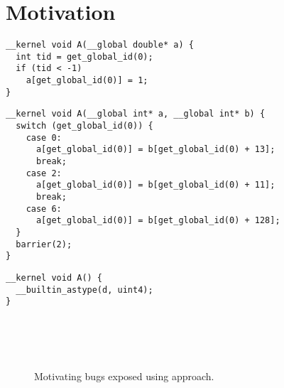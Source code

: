 \section{Motivation}

\newsavebox{\IntelSizetIntReduced}
\begin{lrbox}{\IntelSizetIntReduced}
\begin{lstlisting}
__kernel void A(__global double* a) {
  int tid = get_global_id(0);
  if (tid < -1)
    a[get_global_id(0)] = 1;
}
\end{lstlisting}
\end{lrbox}

\newsavebox{\OclgrindRaceSwitch}
\begin{lrbox}{\OclgrindRaceSwitch}
\begin{lstlisting}
__kernel void A(__global int* a, __global int* b) {
  switch (get_global_id(0)) {
    case 0:
      a[get_global_id(0)] = b[get_global_id(0) + 13];
      break;
    case 2:
      a[get_global_id(0)] = b[get_global_id(0) + 11];
      break;
    case 6:
      a[get_global_id(0)] = b[get_global_id(0) + 128];
  }
  barrier(2);
}
\end{lstlisting}
\end{lrbox}

\newsavebox{\AlmostEverythingCrash}
\begin{lrbox}{\AlmostEverythingCrash}
\begin{lstlisting}
__kernel void A() {
  __builtin_astype(d, uint4);
}
\end{lstlisting}
\end{lrbox}


\begin{figure}
  \centering %
  \\%
  \\%
  \\%
  \caption{Motivating bugs exposed using approach.}%
  \label{lst:motivation}%
\end{figure}

